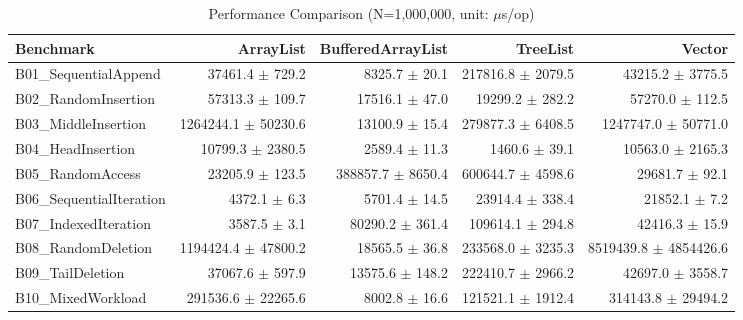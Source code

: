 \begin{table}[htbp]
\centering
\begin{scriptsize}
\caption{Performance Comparison (N=1,000,000, unit: $\mu$s/op)}
\label{tab:performance}
\setlength{\tabcolsep}{2pt}
\begin{tabular*}{\textwidth}{@{}@{\extracolsep{\fill}}lrrrr@{}}
\toprule
Benchmark & ArrayList & BufferedArrayList & TreeList & Vector \\
\midrule
B01\_SequentialAppend & 37461.4 $\pm$ 729.2 & 8325.7 $\pm$ 20.1 & 217816.8 $\pm$ 2079.5 & 43215.2 $\pm$ 3775.5 \\
B02\_RandomInsertion & 57313.3 $\pm$ 109.7 & 17516.1 $\pm$ 47.0 & 19299.2 $\pm$ 282.2 & 57270.0 $\pm$ 112.5 \\
B03\_MiddleInsertion & 1264244.1 $\pm$ 50230.6 & 13100.9 $\pm$ 15.4 & 279877.3 $\pm$ 6408.5 & 1247747.0 $\pm$ 50771.0 \\
B04\_HeadInsertion & 10799.3 $\pm$ 2380.5 & 2589.4 $\pm$ 11.3 & 1460.6 $\pm$ 39.1 & 10563.0 $\pm$ 2165.3 \\
B05\_RandomAccess & 23205.9 $\pm$ 123.5 & 388857.7 $\pm$ 8650.4 & 600644.7 $\pm$ 4598.6 & 29681.7 $\pm$ 92.1 \\
B06\_SequentialIteration & 4372.1 $\pm$ 6.3 & 5701.4 $\pm$ 14.5 & 23914.4 $\pm$ 338.4 & 21852.1 $\pm$ 7.2 \\
B07\_IndexedIteration & 3587.5 $\pm$ 3.1 & 80290.2 $\pm$ 361.4 & 109614.1 $\pm$ 294.8 & 42416.3 $\pm$ 15.9 \\
B08\_RandomDeletion & 1194424.4 $\pm$ 47800.2 & 18565.5 $\pm$ 36.8 & 233568.0 $\pm$ 3235.3 & 8519439.8 $\pm$ 4854426.6 \\
B09\_TailDeletion & 37067.6 $\pm$ 597.9 & 13575.6 $\pm$ 148.2 & 222410.7 $\pm$ 2966.2 & 42697.0 $\pm$ 3558.7 \\
B10\_MixedWorkload & 291536.6 $\pm$ 22265.6 & 8002.8 $\pm$ 16.6 & 121521.1 $\pm$ 1912.4 & 314143.8 $\pm$ 29494.2 \\
\bottomrule
\end{tabular*}
\end{scriptsize}
\end{table}
